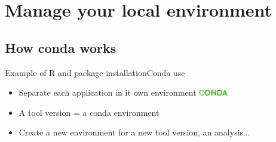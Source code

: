 \section{Manage your local environment}
\subsection{How conda works}
\begin{frame}[<+->]{Example of R and package installation}{Conda use}
\begin{itemize}
	\item Separate each application in it own environment \includegraphics[width=0.1\textwidth]{images/conda_logo.pdf}
	\item A tool version = a conda environment
	\item Create a new environment for a new tool version, an analysis...
\end{itemize}
\end{frame}
